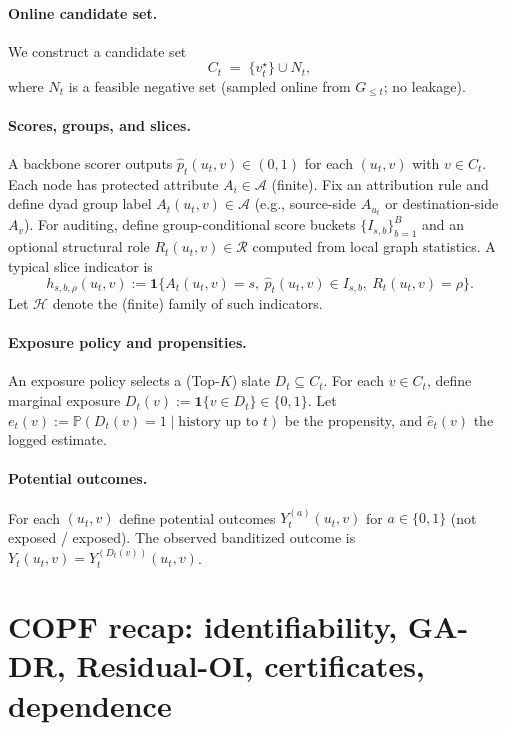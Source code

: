 \documentclass[11pt]{article}
\newcommand{\Pp}{\mathbb{P}} %
\newcommand{\1}{\mathbf{1}}
\newcommand{\cA}{\mathcal{A}}
\newcommand{\cH}{\mathcal{H}}
\newcommand{\cR}{\mathcal{R}}
\theoremstyle{plain}
\theoremstyle{definition}
\theoremstyle{remark}
\begin{document}
\paragraph{Online candidate set.}
We construct a candidate set
\[
C_t \;=\; \{v_t^\star\}\cup N_t,
\]
where $N_t$ is a feasible negative set (sampled online from $G_{\le t}$; no leakage).

\paragraph{Scores, groups, and slices.}
A backbone scorer outputs $\hat p_t(u_t,v)\in(0,1)$ for each $(u_t,v)$ with $v\in C_t$.
Each node has protected attribute $A_i\in\cA$ (finite).
Fix an attribution rule and define dyad group label $A_t(u_t,v)\in\cA$
(e.g., source-side $A_{u_t}$ or destination-side $A_v$).
For auditing, define group-conditional score buckets $\{I_{s,b}\}_{b=1}^B$ and an optional structural role
$R_t(u_t,v)\in\cR$ computed from local graph statistics.
A typical slice indicator is
\[
h_{s,b,\rho}(u_t,v)
:= \1\{A_t(u_t,v)=s,\ \hat p_t(u_t,v)\in I_{s,b},\ R_t(u_t,v)=\rho\}.
\]
Let $\cH$ denote the (finite) family of such indicators.

\paragraph{Exposure policy and propensities.}
An exposure policy selects a (Top-$K$) slate $D_t\subseteq C_t$.
For each $v\in C_t$, define marginal exposure $D_t(v):=\1\{v\in D_t\}\in\{0,1\}$.
Let $e_t(v):=\Pp(D_t(v)=1\mid \text{history up to }t)$ be the propensity, and $\hat e_t(v)$ the logged estimate.

\paragraph{Potential outcomes.}
For each $(u_t,v)$ define potential outcomes $Y_t^{(a)}(u_t,v)$ for $a\in\{0,1\}$ (not exposed / exposed).
The observed banditized outcome is $Y_t(u_t,v)=Y_t^{(D_t(v))}(u_t,v)$.

\section{COPF recap: identifiability, GA-DR, Residual-OI, certificates, dependence}
\label{sec:copf_recap}
\end{document}
